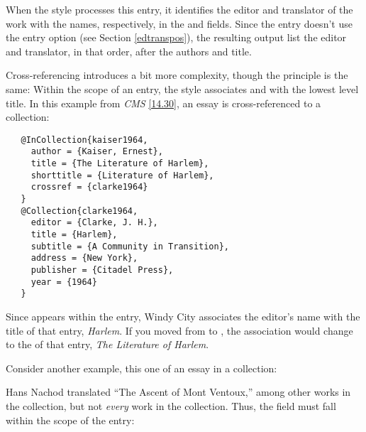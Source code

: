 \documentclass[11pt,letterpaper,oneside]{article}
\begin{document}
\begin{citebib}
\item \cite{adorno1999}
\end{citebib}

\noindent When the style processes this entry, it identifies the
editor and translator of the work with the names, respectively, in the
 and  fields. Since the entry
doesn't use the   entry option (see Section
\ref{edtranspos}), the resulting output list the editor and
translator, in that order, after the authors and title.

Cross-referencing introduces a bit more complexity, though the
principle is the same: Within the scope of an entry, the style
associates  and  with the lowest
level title. In this example from \textit{CMS} \ref{14.30}, an essay
is cross-referenced to a collection:

\begin{verbatim}
   @InCollection{kaiser1964,
     author = {Kaiser, Ernest},
     title = {The Literature of Harlem},
     shorttitle = {Literature of Harlem},
     crossref = {clarke1964}
   }
   @Collection{clarke1964,
     editor = {Clarke, J. H.},
     title = {Harlem},
     subtitle = {A Community in Transition},
     address = {New York},
     publisher = {Citadel Press},
     year = {1964}
   }
\end{verbatim}

\begin{citebib}
\item \cite{kaiser1964}
\end{citebib}

\noindent Since  appears within the
 entry, Windy City associates the editor's name
with the title of that entry, \textit{Harlem}. If you moved
 from  to ,
the association would change to the  of that entry,
\textit{The Literature of Harlem}.

Consider another example, this one of an essay in a collection:

\begin{citebib}
\item \cite{petrarca1948}
\end{citebib}

\noindent Hans Nachod translated ``The Ascent of Mont Ventoux,'' among
other works in the collection, but not \textit{every} work in the
collection. Thus, the  field must fall within the
scope of the  entry:
\end{document}
